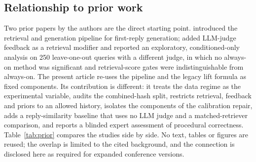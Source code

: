 \subsection{Relationship to prior work}
\label{sec:prior}
Two prior papers by the authors are the direct starting point. \cite{b31}
introduced the retrieval and generation pipeline for first-reply generation;
\cite{b32} added LLM-judge feedback as a retrieval modifier and reported an
exploratory, conditioned-only analysis on 250 leave-one-out queries with a
different judge, in which no always-on method was significant and retrieval-score
gates were indistinguishable from always-on. The present article re-uses the
pipeline and the legacy lift formula as fixed components. Its contribution is
different: it treats the data regime as the experimental variable, audits the
combined-hash split, restricts retrieval, feedback and priors to an allowed history,
isolates the components of the calibration repair, adds a reply-similarity
baseline that uses no LLM judge and a matched-retriever comparison, and reports a blinded expert
assessment of procedural correctness. Table~\ref{tab:prior} compares the studies
side by side. No text, tables or figures are reused; the overlap is limited to the
cited background, and the connection is disclosed here as required for expanded
conference versions.

